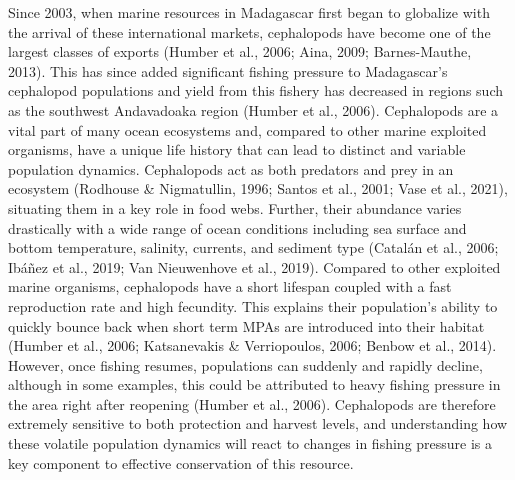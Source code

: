 \documentclass[
  12pt,
]{article}
\begin{document}
Since 2003, when marine resources in Madagascar first began to globalize with the arrival of these international markets, cephalopods have become one of the largest classes of exports (Humber et al., 2006; Aina, 2009; Barnes-Mauthe, 2013). This has since added significant fishing pressure to Madagascar's cephalopod populations and yield from this fishery has decreased in regions such as the southwest Andavadoaka region (Humber et al., 2006). Cephalopods are a vital part of many ocean ecosystems and, compared to other marine exploited organisms, have a unique life history that can lead to distinct and variable population dynamics. Cephalopods act as both predators and prey in an ecosystem (Rodhouse \& Nigmatullin, 1996; Santos et al., 2001; Vase et al., 2021), situating them in a key role in food webs. Further, their abundance varies drastically with a wide range of ocean conditions including sea surface and bottom temperature, salinity, currents, and sediment type (Catalán et al., 2006; Ibáñez et al., 2019; Van Nieuwenhove et al., 2019). Compared to other exploited marine organisms, cephalopods have a short lifespan coupled with a fast reproduction rate and high fecundity. This explains their population's ability to quickly bounce back when short term MPAs are introduced into their habitat (Humber et al., 2006; Katsanevakis \& Verriopoulos, 2006; Benbow et al., 2014). However, once fishing resumes, populations can suddenly and rapidly decline, although in some examples, this could be attributed to heavy fishing pressure in the area right after reopening (Humber et al., 2006). Cephalopods are therefore extremely sensitive to both protection and harvest levels, and understanding how these volatile population dynamics will react to changes in fishing pressure is a key component to effective conservation of this resource.
\end{document}
